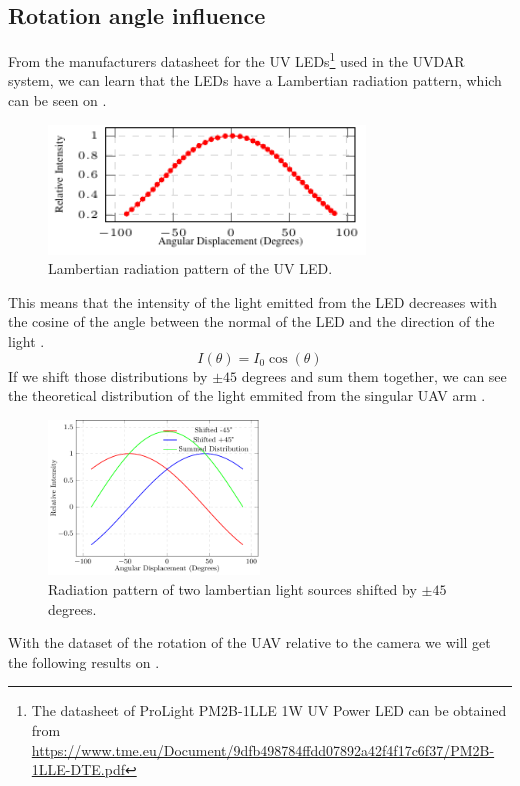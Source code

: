 \subsection{Rotation angle influence}
From the manufacturers datasheet for the UV LEDs\footnote{The datasheet of ProLight PM2B-1LLE 1W UV Power LED can be obtained from \url{https://www.tme.eu/Document/9dfb498784ffdd07892a42f4f17c6f37/PM2B-1LLE-DTE.pdf}}
used in the UVDAR system, we can learn that the LEDs have a Lambertian radiation pattern,
which can be seen on .
\begin {figure}[H]
	\centering
	\includegraphics[width=0.75\textwidth]{./fig/semestral/lambertian/lambertian.pdf}
	\caption{Lambertian radiation pattern of the UV LED.}
	\label{fig:lambertian}
\end{figure}

This means that the intensity of the light emitted from the LED decreases with the cosine
of the angle between the normal of the LED and the direction of the light .
\begin{equation}
	I(\theta) = I_0\cos(\theta)
	\label{eq:lambertian}
\end{equation}
If we shift those distributions by $\pm 45$ degrees and sum them together, we can see the
theoretical distribution of the light emmited from the singular UAV arm .
\begin {figure}[H]
	\centering
	\includegraphics[width=0.50\textwidth]{./fig/semestral/lambertian/3lambertian.pdf}
	\caption{Radiation pattern of two lambertian light sources shifted by $\pm 45$ degrees.}
	\label{fig:lambert_combined}
\end{figure}
With the dataset of the rotation of the UAV relative to the camera we will get the following results
on .

